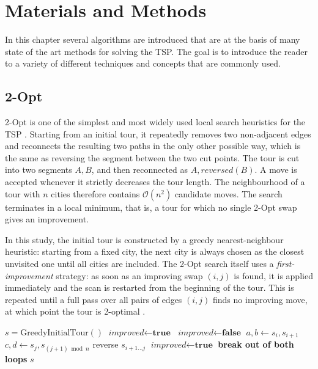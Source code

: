 \section{Materials and Methods}
In this chapter several algorithms are introduced that are at the basis of many state of the art methods for solving the TSP.
The goal is to introduce the reader to a variety of different techniques and concepts that are commonly used.


\subsection{2-Opt}
2-Opt is one of the simplest and most widely used local search heuristics for the TSP \cite{regoLocalSearchMetaheuristics}.
Starting from an initial tour, it repeatedly removes two non-adjacent edges and reconnects the resulting two paths in the only other possible way, which is the same as reversing the segment between the two cut points. The tour is cut into two segments \( A,B \), and then reconnected as \( A, reversed(B) \).
A move is accepted whenever it strictly decreases the tour length.
The neighbourhood of a tour with \( n \) cities therefore contains \( \mathcal{O}(n^2) \) candidate moves.
The search terminates in a local minimum, that is, a tour for which no single 2-Opt swap gives an improvement.

In this study, the initial tour is constructed by a greedy nearest-neighbour heuristic: starting from a fixed city, the next city is always chosen as the closest unvisited one until all cities are included.
The 2-Opt search itself uses a \emph{first-improvement} strategy: as soon as an improving swap \( (i,j) \) is found, it is applied immediately and the scan is restarted from the beginning of the tour.
This is repeated until a full pass over all pairs of edges \( (i,j) \) finds no improving move, at which point the tour is 2-optimal \cite{regoLocalSearchMetaheuristics}.

\begin{algorithm}[H]
	\caption{2-Opt}
	\label{alg:two-opt}
	\begin{algorithmic}[1]
		\STATE $s = \text{GreedyInitialTour}()$
		\STATE $\textit{improved} \leftarrow \textbf{true}$
		\STATE $\textit{improved} \leftarrow \textbf{false}$
		\STATE $a, b \leftarrow s_i, s_{i+1}$
		\STATE $c, d \leftarrow s_j, s_{(j+1) \bmod n}$
		\STATE reverse $s_{i+1 \ldots j}$
		\STATE $\textit{improved} \leftarrow \textbf{true}$
		\STATE \textbf{break out of both loops}
		\ENDIF
		\ENDFOR
		\ENDFOR
		\ENDWHILE
		\RETURN $s$
	\end{algorithmic}
\end{algorithm}

